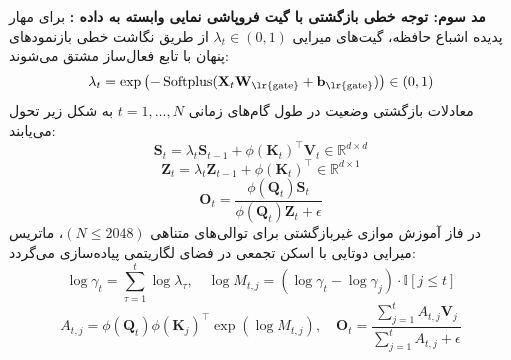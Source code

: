\textbf{مد سوم: توجه خطی بازگشتی با گیت فروپاشی نمایی وابسته به داده :}
برای مهار پدیده اشباع حافظه، گیت‌های میرایی $\lambda_t \in (0, 1)$ از طریق نگاشت خطی بازنمودهای پنهان با تابع فعال‌ساز  مشتق می‌شوند:
\begin{equation}
\lambda_t = \exp\left(-\operatorname{Softplus}(\mathbf{X}_t \mathbf{W}_{\text{\lr{gate}}} + \mathbf{b}_{\text{\lr{gate}}})\right) \in (0, 1)
\end{equation}
معادلات بازگشتی وضعیت در طول گام‌های زمانی $t = 1, \dots, N$ به شکل زیر تحول می‌یابند:
\begin{equation}
\mathbf{S}_t = \lambda_t \mathbf{S}_{t-1} + \phi(\mathbf{K}_t)^\top \mathbf{V}_t \in \mathbb{R}^{d \times d}
\end{equation}
\begin{equation}
\mathbf{Z}_t = \lambda_t \mathbf{Z}_{t-1} + \phi(\mathbf{K}_t)^\top \in \mathbb{R}^{d \times 1}
\end{equation}
\begin{equation}
\mathbf{O}_t = \frac{\phi(\mathbf{Q}_t) \mathbf{S}_t}{\phi(\mathbf{Q}_t) \mathbf{Z}_t + \epsilon}
\end{equation}
در فاز آموزش موازی غیربازگشتی برای توالی‌های متناهی $(N \le 2048)$، ماتریس میرایی دوتایی با اسکن تجمعی در فضای لگاریتمی پیاده‌سازی می‌گردد:
\begin{equation}
\log \gamma_t = \sum_{\tau=1}^t \log \lambda_\tau, \quad \log M_{t, j} = (\log \gamma_t - \log \gamma_j) \cdot \mathbb{I}[j \le t]
\end{equation}
\begin{equation}
A_{t, j} = \phi(\mathbf{Q}_t) \phi(\mathbf{K}_j)^\top \exp(\log M_{t, j}), \quad \mathbf{O}_t = \frac{\sum_{j=1}^t A_{t, j} \mathbf{V}_j}{\sum_{j=1}^t A_{t, j} + \epsilon}
\end{equation}

